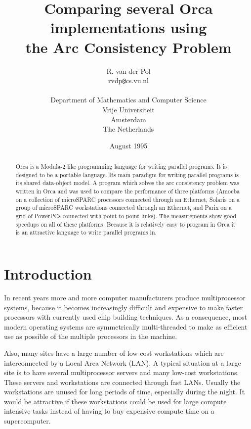 \documentclass[a4paper,11pt]{article}
\begin{document}
\title{Comparing several Orca implementations using \\
the Arc Consistency Problem}
\author{R. van der Pol \\
rvdp{\tt @}cs.vu.nl \\ \\
Department of Mathematics and Computer Science \\
Vrije Universiteit \\
Amsterdam \\
The Netherlands}
\date{August 1995}

\maketitle

\begin{abstract}
Orca is a Modula-2 like programming language for writing parallel programs.
It is designed to be a portable language.  Its main 
paradigm for writing parallel programs is its shared data-object model.
A program which solves the arc consistency problem
was written in Orca
and was used to compare the performance
of three platforms (Amoeba on a collection of microSPARC processors
connected through an Ethernet,
Solaris on a group of microSPARC workstations connected through an Ethernet,
and Parix on a grid of PowerPCs connected with point to point links).
The measurements show good speedups on all of these platforms.
Because it is relatively easy to program in Orca it is an attractive
language to write parallel programs in.
\end{abstract}

\section{Introduction}

In recent years more and more computer
manufacturers produce multiprocessor systems, because it becomes increasingly
difficult and expensive to make faster processors with currently used
chip building techniques. As a consequence, most modern operating systems
are symmetrically multi-threaded to make as efficient use as possible of the
multiple processors in the machine.

Also, many sites have a large number of low cost workstations
which are interconnected by a Local Area Network (LAN).
A typical situation at a large site 
is to have several multiprocessor servers and many low-cost workstations.
These servers and workstations are connected through fast LANs.
Usually the workstations are unused for long
periods of time, especially during the night. It would be attractive if these
workstations could be used for large compute intensive tasks instead of
having to buy expensive compute time on a supercomputer.
\end{document}
